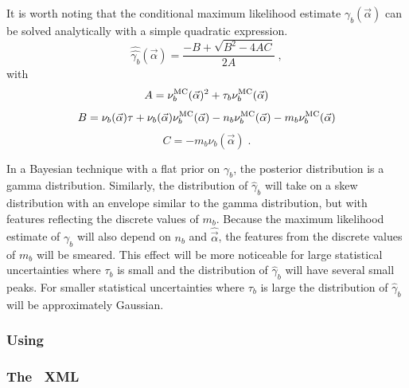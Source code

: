 It is worth noting that the conditional maximum likelihood estimate $\hat{\hat{\gamma_b}}(\vec\alpha)$ can be solved analytically with a simple quadratic expression.
\begin{equation}
\hat{\hat{\gamma_b}}(\vec\alpha) = \frac{-B + \sqrt{B^2 - 4 AC}}{2A} \;,
\end{equation}
with
\begin{equation}
A =  \nu_b^{\rm MC}(\vec\alpha)^2 + \tau_b  \nu_b^{\rm MC}(\vec\alpha)
\end{equation}
\begin{equation}
B= \nu_b(\vec\alpha) \tau +  \nu_b(\vec\alpha) \nu_b^{\rm MC}(\vec\alpha) - n_b  \nu_b^{\rm MC}(\vec\alpha) - m_b  \nu_b^{\rm MC}(\vec\alpha)
\end{equation}
\begin{equation}
C= -m_b \nu_b(\vec\alpha) \;.
\end{equation}


In a Bayesian technique with a flat prior on $\gamma_b$, the posterior distribution is a gamma distribution.  Similarly, the distribution of $\hat\gamma_b$ will take on a skew distribution with an envelope similar to the gamma distribution, but with features reflecting the discrete values of $m_b$.  Because the maximum likelihood estimate of $\gamma_b$ will also depend on $n_b$ and $\hat{\vec\alpha}$, the  features from the discrete values of $m_b$ will be smeared.  This effect will be more noticeable for large statistical uncertainties where $\tau_b$ is small and the distribution  of $\hat\gamma_b$  will have several small peaks.  For smaller statistical uncertainties where $\tau_b$ is large the distribution of $\hat\gamma_b$ will be approximately Gaussian.


\newpage 

\subsubsection{Using \HF\ }



\subsubsection{The \HF\ XML }


